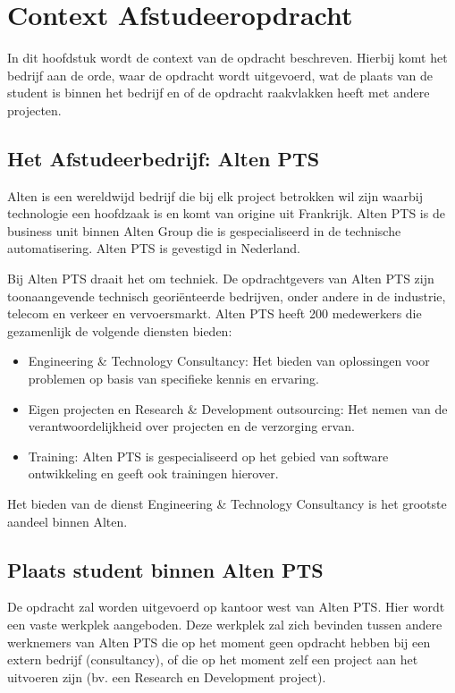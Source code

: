 \documentclass{../local}
\begin{document}
\section{Context Afstudeeropdracht}
In dit hoofdstuk wordt de context van de opdracht beschreven. Hierbij komt het bedrijf aan de orde, waar de opdracht wordt uitgevoerd, wat de plaats van de student is binnen het bedrijf en of de opdracht raakvlakken heeft met andere projecten. 

\subsection{Het Afstudeerbedrijf: Alten PTS}
Alten is een wereldwijd bedrijf die bij elk project betrokken wil zijn waarbij technologie een hoofdzaak is en komt van origine uit Frankrijk. Alten PTS is de business unit binnen Alten Group die is gespecialiseerd in de technische automatisering. Alten PTS is gevestigd in Nederland.

Bij Alten PTS draait het om techniek. De opdrachtgevers van Alten PTS zijn toonaangevende technisch georiënteerde bedrijven, onder andere in de industrie, telecom en verkeer en vervoersmarkt. Alten PTS heeft 200 medewerkers die gezamenlijk de volgende diensten bieden:

\begin{itemize}

\item Engineering \& Technology Consultancy: Het bieden van oplossingen voor problemen op basis van specifieke kennis en ervaring.
\item Eigen projecten en Research \& Development outsourcing: Het nemen van de verantwoordelijkheid over projecten en de verzorging ervan.
\item Training: Alten PTS is gespecialiseerd op het gebied van software ontwikkeling en geeft ook trainingen hierover.

\end{itemize}

Het bieden van de dienst Engineering \& Technology Consultancy is het grootste aandeel binnen Alten.\cite{Alten}

\subsection{Plaats student binnen Alten PTS}
De opdracht zal worden uitgevoerd op kantoor west van Alten PTS. Hier wordt een vaste werkplek aangeboden. Deze werkplek zal zich bevinden tussen andere werknemers van Alten PTS die op het moment geen opdracht hebben bij een extern bedrijf (consultancy), of die op het moment zelf een project aan het uitvoeren zijn (bv. een Research en Development project).
\end{document}
